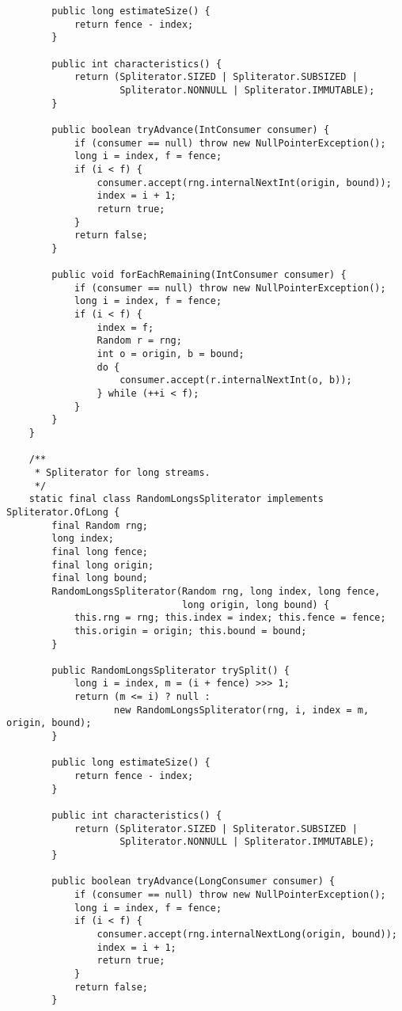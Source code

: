\documentclass[12pt,a4paper,twoside,openright,titlepage,final]{article}
\begin{document}
\begin{verbatim}
        public long estimateSize() {
            return fence - index;
        }

        public int characteristics() {
            return (Spliterator.SIZED | Spliterator.SUBSIZED |
                    Spliterator.NONNULL | Spliterator.IMMUTABLE);
        }

        public boolean tryAdvance(IntConsumer consumer) {
            if (consumer == null) throw new NullPointerException();
            long i = index, f = fence;
            if (i < f) {
                consumer.accept(rng.internalNextInt(origin, bound));
                index = i + 1;
                return true;
            }
            return false;
        }

        public void forEachRemaining(IntConsumer consumer) {
            if (consumer == null) throw new NullPointerException();
            long i = index, f = fence;
            if (i < f) {
                index = f;
                Random r = rng;
                int o = origin, b = bound;
                do {
                    consumer.accept(r.internalNextInt(o, b));
                } while (++i < f);
            }
        }
    }

    /**
     * Spliterator for long streams.
     */
    static final class RandomLongsSpliterator implements Spliterator.OfLong {
        final Random rng;
        long index;
        final long fence;
        final long origin;
        final long bound;
        RandomLongsSpliterator(Random rng, long index, long fence,
                               long origin, long bound) {
            this.rng = rng; this.index = index; this.fence = fence;
            this.origin = origin; this.bound = bound;
        }

        public RandomLongsSpliterator trySplit() {
            long i = index, m = (i + fence) >>> 1;
            return (m <= i) ? null :
                   new RandomLongsSpliterator(rng, i, index = m, origin, bound);
        }

        public long estimateSize() {
            return fence - index;
        }

        public int characteristics() {
            return (Spliterator.SIZED | Spliterator.SUBSIZED |
                    Spliterator.NONNULL | Spliterator.IMMUTABLE);
        }

        public boolean tryAdvance(LongConsumer consumer) {
            if (consumer == null) throw new NullPointerException();
            long i = index, f = fence;
            if (i < f) {
                consumer.accept(rng.internalNextLong(origin, bound));
                index = i + 1;
                return true;
            }
            return false;
        }


\end{verbatim}
\end{document}
